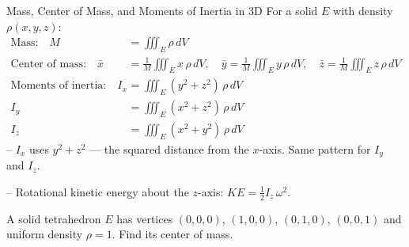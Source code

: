 \documentclass[11pt]{article}
\begin{document}

\begin{formulabox}{Mass, Center of Mass, and Moments of Inertia in 3D}
For a solid $E$ with density $\rho(x,y,z)$:
\begin{align*}
\text{Mass:} \quad M &= \iiint_E \rho\,dV \\[4pt]
\text{Center of mass:} \quad \bar{x} &= \frac{1}{M}\iiint_E x\,\rho\,dV, \quad \bar{y} = \frac{1}{M}\iiint_E y\,\rho\,dV, \quad \bar{z} = \frac{1}{M}\iiint_E z\,\rho\,dV \\[4pt]
\text{Moments of inertia:} \quad I_x &= \iiint_E (y^2+z^2)\,\rho\,dV \\
I_y &= \iiint_E (x^2+z^2)\,\rho\,dV \\
I_z &= \iiint_E (x^2+y^2)\,\rho\,dV
\end{align*}
-- $I_x$ uses $y^2+z^2$ --- the squared distance from the $x$-axis. Same pattern for $I_y$ and $I_z$.

-- Rotational kinetic energy about the $z$-axis: $KE = \tfrac{1}{2} I_z\,\omega^2$.
\end{formulabox}

\begin{example}
A solid tetrahedron $E$ has vertices $(0,0,0)$, $(1,0,0)$, $(0,1,0)$, $(0,0,1)$ and uniform density $\rho = 1$. Find its center of mass.

\end{example}
\end{document}
